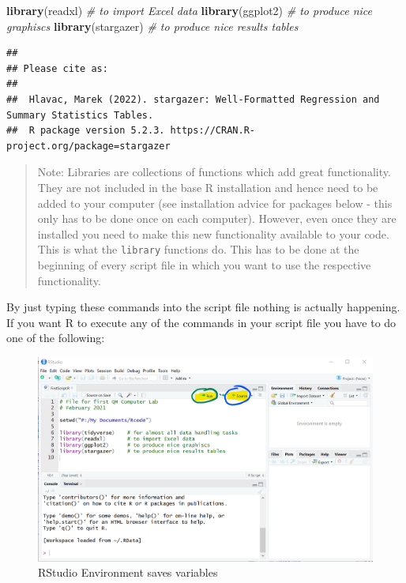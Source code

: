 \documentclass[
]{article}
\newenvironment{Shaded}{\begin{snugshade}}{\end{snugshade}}
\newcommand{\CommentTok}[1]{\textcolor[rgb]{0.56,0.35,0.01}{\textit{#1}}}
\newcommand{\FunctionTok}[1]{\textcolor[rgb]{0.13,0.29,0.53}{\textbf{#1}}}
\newcommand{\NormalTok}[1]{#1}
\begin{document}
\begin{Shaded}
\begin{Highlighting}[]
\FunctionTok{library}\NormalTok{(readxl)       }\CommentTok{\# to import Excel data}
\FunctionTok{library}\NormalTok{(ggplot2)      }\CommentTok{\# to produce nice graphiscs}
\FunctionTok{library}\NormalTok{(stargazer)    }\CommentTok{\# to produce nice results tables}
\end{Highlighting}
\end{Shaded}

\begin{verbatim}
## 
## Please cite as: 
## 
##  Hlavac, Marek (2022). stargazer: Well-Formatted Regression and Summary Statistics Tables.
##  R package version 5.2.3. https://CRAN.R-project.org/package=stargazer
\end{verbatim}

\begin{quote}
Note: Libraries are collections of functions which add great
functionality. They are not included in the base R installation and
hence need to be added to your computer (see installation advice for
packages below - this only has to be done once on each computer).
However, even once they are installed you need to make this new
functionality available to your code. This is what the \texttt{library}
functions do. This has to be done at the beginning of every script file
in which you want to use the respective functionality.
\end{quote}

By just typing these commands into the script file nothing is actually
happening. If you want R to execute any of the commands in your script
file you have to do one of the following:

\begin{figure}
\centering
\includegraphics{RStudio_Image1.png}
\caption{RStudio Environment saves variables}
\end{figure}
\end{document}

